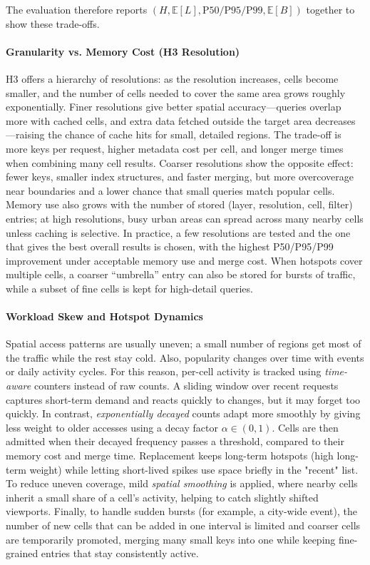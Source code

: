 The evaluation therefore reports $(H, \mathbb{E}[L], \text{P50/P95/P99}, \mathbb{E}[B])$ together to show these trade-offs.

\paragraph{Granularity vs. Memory Cost (H3 Resolution)}
H3 offers a hierarchy of resolutions: as the resolution increases, cells become smaller, and the number of cells needed to cover the same area grows roughly exponentially. Finer resolutions give better spatial accuracy—queries overlap more with cached cells, and extra data fetched outside the target area decreases—raising the chance of cache hits for small, detailed regions. The trade-off is more keys per request, higher metadata cost per cell, and longer merge times when combining many cell results. Coarser resolutions show the opposite effect: fewer keys, smaller index structures, and faster merging, but more overcoverage near boundaries and a lower chance that small queries match popular cells. Memory use also grows with the number of stored (layer, resolution, cell, filter) entries; at high resolutions, busy urban areas can spread across many nearby cells unless caching is selective. In practice, a few resolutions are tested and the one that gives the best overall results is chosen, with the highest P50/P95/P99 improvement under acceptable memory use and merge cost. When hotspots cover multiple cells, a coarser “umbrella” entry can also be stored for bursts of traffic, while a subset of fine cells is kept for high-detail queries.

\paragraph{Workload Skew and Hotspot Dynamics}
Spatial access patterns are usually uneven; a small number of regions get most of the traffic while the rest stay cold. Also, popularity changes over time with events or daily activity cycles. For this reason, per-cell activity is tracked using \emph{time-aware} counters instead of raw counts. A sliding window over recent requests captures short-term demand and reacts quickly to changes, but it may forget too quickly. In contrast, \emph{exponentially decayed} counts adapt more smoothly by giving less weight to older accesses using a decay factor $\alpha\in(0,1)$. Cells are then admitted when their decayed frequency passes a threshold, compared to their memory cost and merge time. Replacement keeps long-term hotspots (high long-term weight) while letting short-lived spikes use space briefly in the "recent" list. To reduce uneven coverage, mild \emph{spatial smoothing} is applied, where nearby cells inherit a small share of a cell's activity, helping to catch slightly shifted viewports. Finally, to handle sudden bursts (for example, a city-wide event), the number of new cells that can be added in one interval is limited and coarser cells are temporarily promoted, merging many small keys into one while keeping fine-grained entries that stay consistently active.

